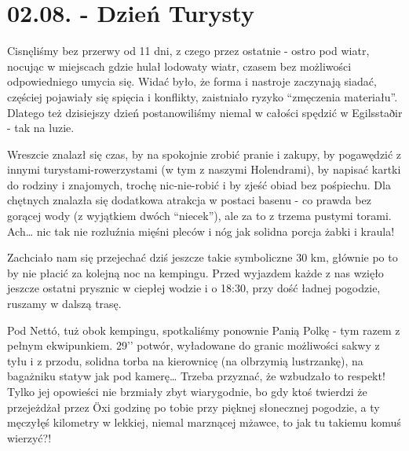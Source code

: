 \chapter{02.08. - Dzień Turysty}


Cisnęliśmy bez przerwy od 11 dni, z czego przez ostatnie - ostro pod wiatr, nocując w miejscach gdzie hulał lodowaty wiatr, czasem bez możliwości odpowiedniego umycia się. Widać było, że forma i nastroje zaczynają siadać, częściej pojawiały się spięcia i konflikty, zaistniało ryzyko “zmęczenia materiału”. Dlatego też dzisiejszy dzień postanowiliśmy niemal w całości spędzić w Egilsstaðir - tak na luzie.

Wreszcie znalazł się czas, by na spokojnie zrobić pranie i zakupy, by pogawędzić z innymi turystami-rowerzystami (w tym z naszymi Holendrami), by napisać kartki do rodziny i znajomych, trochę nic-nie-robić i by zjeść obiad bez pośpiechu. Dla chętnych znalazła się dodatkowa atrakcja w postaci basenu - co prawda bez gorącej wody (z wyjątkiem dwóch “niecek”), ale za to z trzema pustymi torami. Ach… nic tak nie rozluźnia mięśni pleców i nóg jak solidna porcja żabki i kraula!


Zachciało nam się przejechać dziś jeszcze takie symboliczne 30 km, głównie po to by nie płacić za kolejną noc na kempingu. Przed wyjazdem każde z nas wzięło jeszcze ostatni prysznic w ciepłej wodzie i o 18:30, przy dość ładnej pogodzie, ruszamy w dalszą trasę.

Pod Nettó, tuż obok kempingu, spotkaliśmy ponownie Panią Polkę - tym razem z pełnym ekwipunkiem. 29’’ potwór, wyładowane do granic możliwości sakwy z tyłu i z przodu, solidna torba na kierownicę (na olbrzymią lustrzankę), na bagażniku statyw jak pod kamerę… Trzeba przyznać, że wzbudzało to respekt! Tylko jej opowieści nie brzmiały zbyt wiarygodnie, bo gdy ktoś twierdzi że przejeżdżał przez Öxi godzinę po tobie przy pięknej słonecznej pogodzie, a ty męczyłęś kilometry w lekkiej, niemal marznącej mżawce, to jak tu takiemu komuś wierzyć?!


